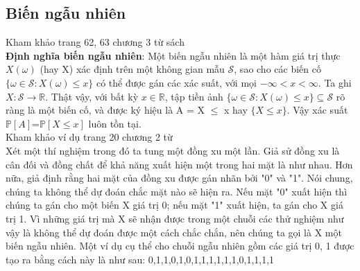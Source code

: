 \documentclass[a4paper, 13pt]{report}
\begin{document}
\subsection*{Biến ngẫu nhiên}
Kham khảo trang 62, 63 chương 3 từ sách \cite{TKCNUDR}\\
\textbf{Định nghĩa biến ngẫu nhiên}: Một biến ngẫu nhiên là một hàm giá trị thực $X(\omega)$ (hay X) xác định trên một không gian mẫu $\mathcal{S}$, sao cho các biến cố $\{\omega \in \mathcal{S}: X(\omega) \leq x\}$ có thể được gán các xác suất, với mọi  $-\infty < x < \infty$. Ta ghi $X: \mathcal{S} \rightarrow \mathbb{R}$. Thật vậy, với bất kỳ $x \in \mathbb{R}$, tập tiền ảnh $\{\omega \in \mathcal{S}:X(\omega) \leq x\}\subseteq \mathcal{S}$ rõ ràng là một biến cố, và được ký hiệu là A = X $\leq$ x hay $\{X \leq x\}$. Vậy xác suất $\mathbb{P}[A]$=$\mathbb{P}[X \leq x]$ luôn tồn tại.\\
Kham khảo ví dụ trang 20 chương 2 từ \cite{TKCNUDR}\\
Xét một thí nghiệm trong đó ta tung một đồng xu một lần. Giả sử đồng xu là cân đối và đồng chất để khả năng xuất hiện một trong hai mặt là như nhau. Hơn nữa, giả định rằng hai mặt của đồng xu được gán nhãn bởi "0" và "1". Nói chung, chúng ta không thể dự đoán chắc mặt nào sẽ hiện ra. Nếu mặt "0" xuất hiện thì chúng ta gán cho một biến X giá trị 0; nếu mặt "1" xuất hiện, ta gán cho X giá trị 1. Vì những giá trị mà X sẽ nhận được trong một chuỗi các thử nghiệm như vậy là không thể dự đoán được một cách chắc chắn, nên chúng ta gọi là X một biến ngẫu nhiên. Một ví dụ cụ thể cho chuỗi ngẫu nhiên gồm các giá trị 0, 1 được tạo ra bằng cách này là như sau: 0,1,1,0,1,0,1,1,1,1,1,1,0,1,1,1,1\\
\end{document}
